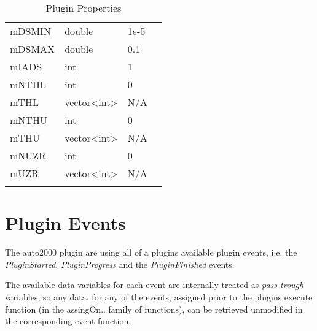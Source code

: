\begin{landscape}
\begin{longtable}{p{4cm} l p{3cm}  p{10cm}}
mDSMIN                              &   double              & 1e-5     &   \\
mDSMAX                              &   double              & 0.1      &   \\
mIADS                               &   int                 & 1        &   \\
mNTHL                               &   int                 & 0        &   \\
mTHL                                &   vector<int>         & N/A      &   \\
mNTHU                               &   int                 & 0        &   \\
mTHU                                &   vector<int>         & N/A      &   \\
mNUZR                               &   int                 & 0        &   \\
mUZR                                &   vector<int>         & N/A      &   \\

                                                        
\hline %
\caption{Plugin Properties} 
\label{table:autoPluginProperties} 
\end{longtable}

\end{landscape}

\section{Plugin Events}
The auto2000 plugin are using all of a plugins available plugin events, i.e. the \emph{PluginStarted}, \emph{PluginProgress} and the \emph{PluginFinished} events.

The available data variables for each event are internally treated as \emph{pass trough} variables, so any data, for any of the events, assigned prior to 
the plugins execute function (in the assingOn.. family of functions), can be retrieved unmodified in the corresponding event function.

